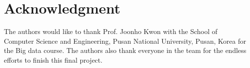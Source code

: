 \documentclass[journal]{IEEEtran}
\begin{document}


\section*{Acknowledgment}

The authors would like to thank Prof. Joonho Kwon with the School of Computer Science and Engineering, Pusan National University, Pusan, Korea for the Big data course. The authors also thank everyone in the team for the endless efforts to finish this final project.

\ifCLASSOPTIONcaptionsoff
  \newpage
\fi





%
%
%




\end{document}
